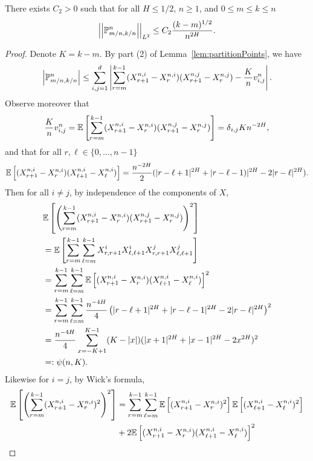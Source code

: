 \documentclass{article}
\begin{document}
\begin{lemma}\label{lem:PControlPartition}
There exists $C_2 > 0$ such that for all $H \leq 1/2$, $n \geq 1$, and $0 \leq m \leq k \leq n$
\[
\left|\left|\mathbb P^n_{m/n,k/n} \right|\right|_{L^2} \leq C_2 \frac{(k-m)^{1/2}}{n^{2H}}.
\]
\end{lemma}

\begin{proof}
Denote $K = k-m$. By part (2) of Lemma~\ref{lem:partitionPoints}, we have
\[
\left|\mathbb P^n_{m/n,k/n} \right| \leq \sum_{i,j=1}^d \left|\sum_{r=m}^{k-1} (X^{n,i}_{r+1} - X^{n,i}_r)(X^{n,j}_{r+1}- X^{n,j}_r) - \frac{K}{n}v^n_{i,j} \right|.
\]
Observe moreover that
\[
\frac{K}{n}v^n_{i,j} = \EEE{\sum_{r=m}^{k-1}(X^{n,i}_{r+1} - X^{n,i}_r)(X^{n,j}_{r+1}- X^{n,j}_r)} = \delta_{i,j} K n^{-2H},
\]
and that for all $r,\ell \in \{0,\ldots, n-1\}$
\[
\mathbb E \left[ (X^{n,i}_{r+1} - X^{n,i}_r)(X^{n,i}_{\ell+1} - X^{n,i}_\ell) \right] = \frac{n^{-2H}}{2}(|r-\ell+1|^{2H} + |r-\ell-1)|^{2H} - 2|r-\ell|^{2H}).
\]
Then for all $i \neq j$, by independence of the components of $X$,
\begin{align*}
& \EEE{\left(\sum_{r=m}^{k-1}  (X^{n,i}_{r+1} - X^{n,i}_r)(X^{n,j}_{r+1}- X^{n,j}_r) \right)^2}
\\ &= \EEE{\sum_{r=m}^{k-1} \sum_{\ell=m}^{k-1} X^i_{r,r+1}X^i_{\ell,\ell+1} X^j_{r,r+1} X^j_{\ell,\ell+1}} \\
&= \sum_{r=m}^{k-1} \sum_{\ell=m}^{k-1} \EEE{(X^{n,i}_{r+1} - X^{n,i}_r)(X^{n,i}_{\ell+1} - X^{n,i}_{\ell})}^2 \\
&= \sum_{r=m}^{k-1} \sum_{\ell=m}^{k-1} \frac{n^{-4H}}{4}\left(|r-\ell+1|^{2H} + |r-\ell-1|^{2H} - 2|r-\ell|^{2H} \right)^2 \\
&= \frac{n^{-4H}}{4} \sum_{x=-K+1}^{K-1} (K-|x|)(|x+1|^{2H} + |x-1|^{2H} - 2x^{2H})^2 \\
&=: \psi(n,K).
\end{align*}
Likewise for $i=j$, by Wick's formula,
\begin{align*}
\EEE{\left(\sum_{r=m}^{k-1} (X^{n,i}_{r+1} - X^{n,i}_r)^2 \right)^2}
&= \sum_{r=m}^{k-1} \sum_{\ell=m}^{k-1} \EEE{(X^{n,i}_{r+1} - X^{n,i}_{r})^2} \EEE{(X^{n,i}_{\ell+1} - X^{n,i}_{\ell})^2} \\
&+ 2\EEE{(X^{n,i}_{r+1} - X^{n,i}_{r})(X^{n,i}_{\ell+1} - X^{n,i}_{\ell})}^2  \\

\end{align*}
\end{proof}
\end{document}
